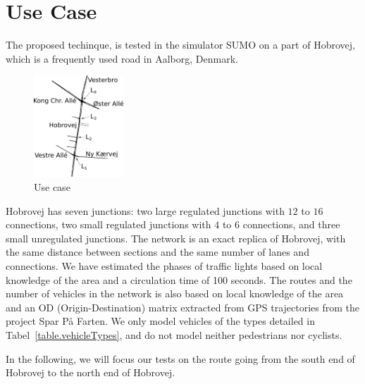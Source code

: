 \section{Use Case}\label{sec:UseCase}
The proposed techinque, \tech is tested in the simulator SUMO on a part of Hobrovej, which is a frequently used road in Aalborg, Denmark.

\begin{figure}[htb]
\centering
\includegraphics[width=0.3\textwidth]{../images/HobrovejNy.png}
\caption{Use case}
\label{fig:Introduction:hobro}
\end{figure}

Hobrovej has seven junctions: two large regulated junctions with $12$ to $16$ connections, two small regulated junctions with $4$ to $6$ connections, and three small unregulated junctions.
The network is an exact replica of Hobrovej, with the same distance between sections and the same number of lanes and connections. 
We have estimated the phases of traffic lights based on local knowledge of the area and a circulation time of 100 seconds.
The routes and the number of vehicles in the network is also based on local knowledge of the area and an OD (Origin-Destination) matrix extracted from GPS trajectories from the project Spar På Farten\cite{}.
We only model vehicles of the types detailed in Tabel~\ref{table.vehicleTypes}, and do not model neither pedestrians nor cyclists.

In the following, we will focus our tests on the route going from the south end of Hobrovej to the north end of Hobrovej.
